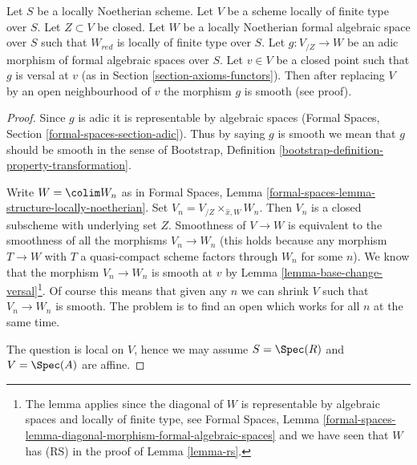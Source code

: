 \begin{lemma}
\label{lemma-openness-smoothness}
Let $S$ be a locally Noetherian scheme. Let $V$ be a scheme locally
of finite type over $S$. Let $Z \subset V$ be closed. Let $W$ be
a locally Noetherian formal algebraic space over $S$ such that
$W_{red}$ is locally of finite type over $S$. Let $g : V_{/Z} \to W$
be an adic morphism of formal algebraic spaces over $S$. Let $v \in V$
be a closed point such that $g$ is versal at $v$ (as in
Section \ref{section-axioms-functors}).
Then after replacing $V$ by an open neighbourhood of $v$ the
morphism $g$ is smooth (see proof).
\end{lemma}

\begin{proof}
Since $g$ is adic it is representable by algebraic spaces (Formal Spaces,
Section \ref{formal-spaces-section-adic}).
Thus by saying $g$ is smooth we mean that $g$ should be smooth
in the sense of
Bootstrap, Definition \ref{bootstrap-definition-property-transformation}.

\medskip\noindent
Write $W = \colim W_n$ as in Formal Spaces, Lemma
\ref{formal-spaces-lemma-structure-locally-noetherian}.
Set $V_n = V_{/Z} \times_{\hat x, W} W_n$.
Then $V_n$ is a closed subscheme with underlying set $Z$.
Smoothness of $V \to W$ is equivalent to the smoothness
of all the morphisms $V_n \to W_n$ (this holds because any morphism
$T \to W$ with $T$ a quasi-compact scheme factors through
$W_n$ for some $n$). We know that the morphism $V_n \to W_n$
is smooth at $v$ by
Lemma \ref{lemma-base-change-versal}\footnote{The lemma applies since
the diagonal of $W$ is representable by algebraic spaces and
locally of finite type, see Formal Spaces, Lemma
\ref{formal-spaces-lemma-diagonal-morphism-formal-algebraic-spaces}
and we have seen that $W$ has (RS) in the proof of Lemma \ref{lemma-rs}.}.
Of course this means that given any $n$ we can shrink $V$
such that $V_n \to W_n$ is smooth. The problem is to find
an open which works for all $n$ at the same time.

\medskip\noindent
The question is local on $V$, hence we may assume $S = \Spec(R)$ and
$V = \Spec(A)$ are affine.


\end{proof}
